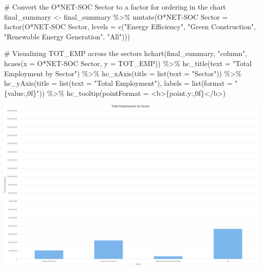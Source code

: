 \documentclass[
  letterpaper,
  DIV=11,
  numbers=noendperiod]{scrartcl}
\newenvironment{Shaded}{\begin{snugshade}}{\end{snugshade}}
\newcommand{\AttributeTok}[1]{\textcolor[rgb]{0.40,0.45,0.13}{#1}}
\newcommand{\CommentTok}[1]{\textcolor[rgb]{0.37,0.37,0.37}{#1}}
\newcommand{\FunctionTok}[1]{\textcolor[rgb]{0.28,0.35,0.67}{#1}}
\newcommand{\NormalTok}[1]{\textcolor[rgb]{0.00,0.23,0.31}{#1}}
\newcommand{\OtherTok}[1]{\textcolor[rgb]{0.00,0.23,0.31}{#1}}
\newcommand{\SpecialCharTok}[1]{\textcolor[rgb]{0.37,0.37,0.37}{#1}}
\newcommand{\StringTok}[1]{\textcolor[rgb]{0.13,0.47,0.30}{#1}}
\begin{document}
\begin{Shaded}
\begin{Highlighting}[]
\CommentTok{\# Convert the O*NET{-}SOC Sector to a factor for ordering in the chart}
\NormalTok{final\_summary }\OtherTok{\textless{}{-}}\NormalTok{ final\_summary }\SpecialCharTok{\%\textgreater{}\%}
  \FunctionTok{mutate}\NormalTok{(}\StringTok{\textasciigrave{}}\AttributeTok{O*NET{-}SOC Sector}\StringTok{\textasciigrave{}} \OtherTok{=} \FunctionTok{factor}\NormalTok{(}\StringTok{\textasciigrave{}}\AttributeTok{O*NET{-}SOC Sector}\StringTok{\textasciigrave{}}\NormalTok{, }\AttributeTok{levels =} \FunctionTok{c}\NormalTok{(}\StringTok{"Energy Efficiency"}\NormalTok{, }\StringTok{"Green Construction"}\NormalTok{, }\StringTok{"Renewable Energy Generation"}\NormalTok{, }\StringTok{"All"}\NormalTok{)))}

\CommentTok{\# Visualizing TOT\_EMP across the sectors}
\FunctionTok{hchart}\NormalTok{(final\_summary, }\StringTok{"column"}\NormalTok{, }\FunctionTok{hcaes}\NormalTok{(}\AttributeTok{x =} \StringTok{\textasciigrave{}}\AttributeTok{O*NET{-}SOC Sector}\StringTok{\textasciigrave{}}\NormalTok{, }\AttributeTok{y =}\NormalTok{ TOT\_EMP)) }\SpecialCharTok{\%\textgreater{}\%}
  \FunctionTok{hc\_title}\NormalTok{(}\AttributeTok{text =} \StringTok{"Total Employment by Sector"}\NormalTok{) }\SpecialCharTok{\%\textgreater{}\%}
  \FunctionTok{hc\_xAxis}\NormalTok{(}\AttributeTok{title =} \FunctionTok{list}\NormalTok{(}\AttributeTok{text =} \StringTok{"Sector"}\NormalTok{)) }\SpecialCharTok{\%\textgreater{}\%}
  \FunctionTok{hc\_yAxis}\NormalTok{(}\AttributeTok{title =} \FunctionTok{list}\NormalTok{(}\AttributeTok{text =} \StringTok{"Total Employment"}\NormalTok{), }\AttributeTok{labels =} \FunctionTok{list}\NormalTok{(}\AttributeTok{format =} \StringTok{"\{value:,0f\}"}\NormalTok{)) }\SpecialCharTok{\%\textgreater{}\%}
  \FunctionTok{hc\_tooltip}\NormalTok{(}\AttributeTok{pointFormat =} \StringTok{\textquotesingle{}\textless{}b\textgreater{}\{point.y:,0f\}\textless{}/b\textgreater{}\textquotesingle{}}\NormalTok{)}
\end{Highlighting}
\end{Shaded}

\includegraphics{index_files/figure-pdf/unnamed-chunk-13-1.pdf}
\end{document}
